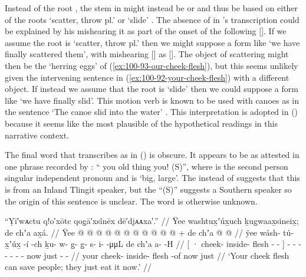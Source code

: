 Instead of the root , the stem in  might instead be  or  and thus be based on either of the roots  ‘scatter, throw pl.’ or  ‘slide’ \parencites[08/43–48]{leer:1973}[445–447]{leer:1976}.
The absence of  in \citeauthor{swanton:1909}’s transcription could be explained by his mishearing it as part of the onset of the following  [].
If we assume the root is  ‘scatter, throw pl.’ then we might suppose a form like  ‘we have finally scattered them’, with \citeauthor{swanton:1909} mishearing [] as [].
The object of scattering might then be the  ‘herring eggs’ of (\ref{ex:100-93-our-cheek-flesh}), but this seems unlikely given the intervening sentence in (\ref{ex:100-92-your-cheek-flesh}) with a different object.
If instead we assume that the root is   ‘slide’ then we could suppose a form like   ‘we have finally slid’.
This motion verb is known to be used with canoes as in the sentence  ‘The canoe slid into the water’ \parencite[196.2725]{story-naish:1973}.
This interpretation is adopted in (\lastx) because it seems like the most plausible of the hypothetical readings in this narrative context.

The final word that \citeauthor{swanton:1909} transcribes as  in (\nextx) is obscure.
It appears to be  as attested in one phrase recorded by \textcite[f05/212]{leer:1973}: “ you old thing you! (S)”, where  is the second person singular independent pronoun and  is ‘big, large’.
The  instead of  suggests that this is from an Inland Tlingit speaker, but the “(S)” suggests a Southern speaker so the origin of this sentence is unclear.
The word  is otherwise unknown. 

\ex\label{ex:100-92-your-cheek-flesh}%
%
\begingl
	\glpreamble	“Ỵī′wᴀctu q!o′xōtc qog̣ā′xsînēx dē′djᴀᴀxa′.” //
	\glpreamble	Ÿee washtux̱ʼúx̱uch ḵug̱waax̱sineix̱; de chʼa ax̱á. //
	\gla	{} Ÿee  @ {} @ {} @ {} @ {} {}
		 @ {} @ {} @ {} @ {} @ {} @ {} @ {} +
		de chʼa  @ {} @ {} //
	\glb	{} ÿee wásh- tú- x̱ʼúx̱ -í -ch {}
		ḵu- w- g̱- g̱- s- i-  -μμL
		de chʼa a-  -H //
	\glc	{}[ · cheek- inside- flesh - - {}]
		- - - - - -  -
		now just -  - //
	\gld	{} your cheek- inside- flesh -of {} {}
		 {} {} {} {} {} {} {}
		now just  {} {} //
	\glft	‘Your cheek flesh can save people; they just eat it now.’
		//
\endgl
\xe

